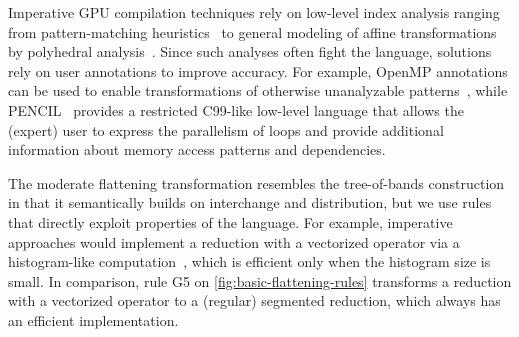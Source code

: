 Imperative GPU compilation techniques rely on low-level index
analysis ranging from pattern-matching
heuristics~\cite{InformalTiling,Lime} to general modeling
of affine transformations by polyhedral analysis~\cite{PolyPluto2,PolyhedralOpt}.
%
Since such analyses often fight the language, solutions rely on user
annotations to improve accuracy. For example, OpenMP annotations can
be used to enable transformations of otherwise unanalyzable
patterns~\cite{chatarasi2015polyhedral}, while
PENCIL~\cite{PencilPACT} provides a restricted C99-like low-level
language that allows the (expert) user to express the parallelism of
loops and provide additional information about memory access patterns
and dependencies.

The moderate flattening transformation resembles the tree-of-bands
construction~\cite{PolyPluto2} in that it semantically builds on
interchange and distribution, but we use rules that directly exploit
properties of the language. For example, imperative approaches would
implement a reduction with a vectorized operator via a histogram-like
computation~\cite{RedPencil}, which is efficient only when the
histogram size is small.  In comparison, rule G5 on
\cref{fig:basic-flattening-rules} transforms a reduction with a
vectorized operator to a (regular) segmented reduction, which always
has an efficient implementation.

